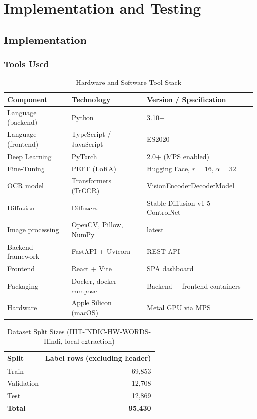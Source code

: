 \documentclass[12pt,a4paper]{report}
\begin{document}
\chapter{Implementation and Testing}

\section{Implementation}

\subsection{Tools Used}

\begin{table}[htbp]
\centering
\caption{Hardware and Software Tool Stack}
\small
\begin{tabular}{p{4cm}p{4.6cm}p{5cm}}
\toprule
\textbf{Component} & \textbf{Technology} & \textbf{Version / Specification} \\
\midrule
Language (backend) & Python & 3.10+ \\
Language (frontend) & TypeScript / JavaScript & ES2020 \\
Deep Learning & PyTorch & 2.0+ (MPS enabled) \\
Fine-Tuning & PEFT (LoRA) & Hugging Face, $r=16$, $\alpha=32$ \\
OCR model & Transformers (TrOCR) & VisionEncoderDecoderModel \\
Diffusion & Diffusers & Stable Diffusion v1-5 + ControlNet \\
Image processing & OpenCV, Pillow, NumPy & latest \\
Backend framework & FastAPI + Uvicorn & REST API \\
Frontend & React + Vite & SPA dashboard \\
Packaging & Docker, docker-compose & Backend + frontend containers \\
Hardware & Apple Silicon (macOS) & Metal GPU via MPS \\
\bottomrule
\end{tabular}
\end{table}

\begin{table}[htbp]
\centering
\caption{Dataset Split Sizes (IIIT-INDIC-HW-WORDS-Hindi, local extraction)}
\small
\begin{tabular}{lr}
\toprule
\textbf{Split} & \textbf{Label rows (excluding header)} \\
\midrule
Train & 69{,}853 \\
Validation & 12{,}708 \\
Test & 12{,}869 \\
\midrule
\textbf{Total} & \textbf{95{,}430} \\
\bottomrule
\end{tabular}
\end{table}
\end{document}
